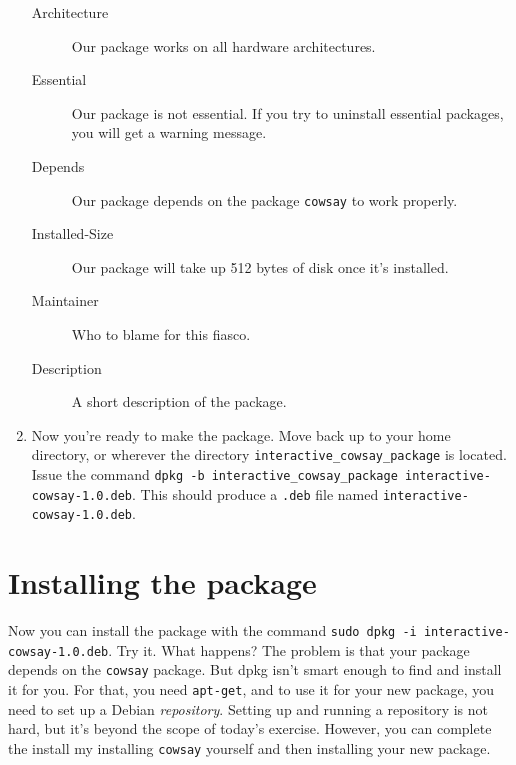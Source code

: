 \documentclass{article}
\begin{document}
\begin{enumerate}
\begin{description}
			\item[Architecture]Our package works on all hardware architectures.

			\item[Essential]Our package is not essential. If you try to uninstall essential packages, you will get a warning message.

			\item[Depends]Our package depends on the package \texttt{cowsay} to work properly.
				
			\item[Installed-Size]Our package will take up 512 bytes of disk once it's installed.

			\item[Maintainer]Who to blame for this fiasco.

			\item[Description]A short description of the package.
		\end{description}
	\item Now you're ready to make the package. Move back up to your home directory, or wherever the directory \texttt{interactive\_cowsay\_package} is located. Issue the command \texttt{dpkg -b interactive\_cowsay\_package interactive-cowsay-1.0.deb}. This should produce a \texttt{.deb} file named \texttt{interactive-cowsay-1.0.deb}.
	\end{enumerate}
	\section{Installing the package}
	Now you can install the package with the command \texttt{sudo dpkg -i interactive-cowsay-1.0.deb}. Try it.
		What happens?
		The problem is that your package depends on the \texttt{cowsay} package. But dpkg isn't smart enough to find and install it for you. For that, you need \texttt{apt-get}, and to use it for your new package, you need to set up a Debian \emph{repository}. Setting up and running a repository is not hard, but it's beyond the scope of today's exercise.  However, you can complete the install my installing \texttt{cowsay} yourself and then installing your new package.
\end{document}
